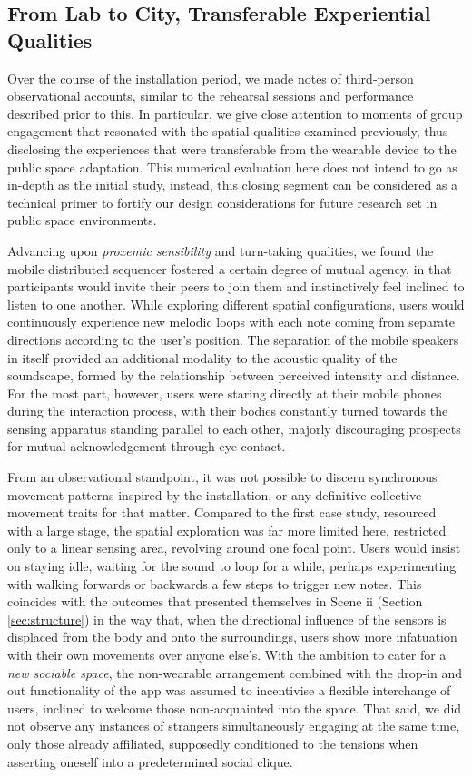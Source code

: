 \subsection*{From Lab to City, Transferable Experiential Qualities}
\label{sec:fromLabToCity}

Over the course of the installation period, we made notes of third-person observational accounts, similar to the rehearsal sessions and performance described prior to this. In particular, we give close attention to moments of group engagement that resonated with the spatial qualities examined previously, thus disclosing the experiences that were transferable from the wearable device to the public space adaptation. This numerical evaluation here does not intend to go as in-depth as the initial study, instead, this closing segment can be considered as a technical primer to fortify our design considerations for future research set in public space environments.

Advancing upon \textit{proxemic sensibility} and turn-taking qualities, we found the mobile distributed sequencer fostered a certain degree of mutual agency, in that participants would invite their peers to join them and instinctively feel inclined to listen to one another. While exploring different spatial configurations, users would continuously experience new melodic loops with each note coming from separate directions according to the user's position. The separation of the mobile speakers in itself provided an additional modality to the acoustic quality of the soundscape, formed by the relationship between perceived intensity and distance. For the most part, however, users were staring directly at their mobile phones during the interaction process, with their bodies constantly turned towards the sensing apparatus standing parallel to each other, majorly discouraging prospects for mutual acknowledgement through eye contact.

From an observational standpoint, it was not possible to discern synchronous movement patterns inspired by the installation, or any definitive collective movement traits for that matter. Compared to the first case study, resourced with a large stage, the spatial exploration was far more limited here, restricted only to a linear sensing area, revolving around one focal point. Users would insist on staying idle, waiting for the sound to loop for a while, perhaps experimenting with walking forwards or backwards a few steps to trigger new notes. This coincides with the outcomes that presented themselves in Scene ii (Section \ref{sec:structure}) in the way that, when the directional influence of the sensors is displaced from the body and onto the surroundings, users show more infatuation with their own movements over anyone else's. With the ambition to cater for a \textit{new sociable space}, the non-wearable arrangement combined with the drop-in and out functionality of the app was assumed to incentivise a flexible interchange of users, inclined to welcome those non-acquainted into the space. That said, we did not observe any instances of strangers simultaneously engaging at the same time, only those already affiliated, supposedly conditioned to the tensions when asserting oneself into a predetermined social clique.

